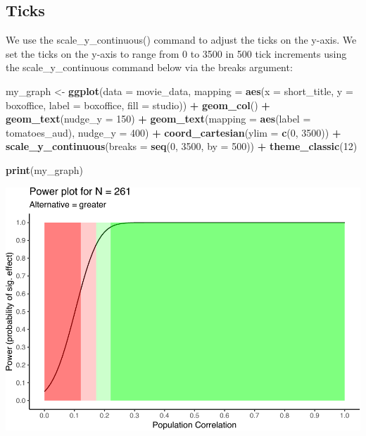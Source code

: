 \documentclass[
]{krantz}
\makeatletter
\newenvironment{Shaded}{\begin{snugshade}}{\end{snugshade}}
\newcommand{\DataTypeTok}[1]{\textcolor[rgb]{0.27,0.27,0.27}{#1}}
\newcommand{\DecValTok}[1]{\textcolor[rgb]{0.06,0.06,0.06}{#1}}
\newcommand{\KeywordTok}[1]{\textcolor[rgb]{0.27,0.27,0.27}{\textbf{#1}}}
\newcommand{\NormalTok}[1]{#1}
\newcommand{\OperatorTok}[1]{\textcolor[rgb]{0.43,0.43,0.43}{\textbf{#1}}}
\newcommand{\StringTok}[1]{\textcolor[rgb]{0.5,0.5,0.5}{#1}}
\newenvironment{kframe}{%
\medskip{}
\setlength{\fboxsep}{.8em}
 \def\at@end@of@kframe{}%
 \ifinner\ifhmode%
  \def\at@end@of@kframe{\end{minipage}}%
  \begin{minipage}{\columnwidth}%
 \fi\fi%
 \def\FrameCommand##1{\hskip\@totalleftmargin \hskip-\fboxsep
 \colorbox{shadecolor}{##1}\hskip-\fboxsep
     \hskip-\linewidth \hskip-\@totalleftmargin \hskip\columnwidth}%
 \MakeFramed {\advance\hsize-\width
   \@totalleftmargin\z@ \linewidth\hsize
   \@setminipage}}%
 {\par\unskip\endMakeFramed%
 \at@end@of@kframe}
\renewenvironment{Shaded}{\begin{kframe}}{\end{kframe}}
\makeatother
\begin{document}
\hypertarget{ticks}{%
\subsection{Ticks}\label{ticks}}

We use the scale\_y\_continuous() command to adjust the ticks on the y-axis. We set the ticks on the y-axis to range from 0 to 3500 in 500 tick increments using the scale\_y\_continuous command below via the breaks argument:

\begin{Shaded}
\begin{Highlighting}[]
\NormalTok{my_graph <-}\StringTok{ }\KeywordTok{ggplot}\NormalTok{(}\DataTypeTok{data =}\NormalTok{ movie_data,}
           \DataTypeTok{mapping =} \KeywordTok{aes}\NormalTok{(}\DataTypeTok{x =}\NormalTok{ short_title,}
                         \DataTypeTok{y =}\NormalTok{ boxoffice,}
                         \DataTypeTok{label =}\NormalTok{ boxoffice, }
                         \DataTypeTok{fill =}\NormalTok{ studio)) }\OperatorTok{+}
\StringTok{  }\KeywordTok{geom_col}\NormalTok{() }\OperatorTok{+}
\StringTok{  }\KeywordTok{geom_text}\NormalTok{(}\DataTypeTok{nudge_y =} \DecValTok{150}\NormalTok{)  }\OperatorTok{+}
\StringTok{  }\KeywordTok{geom_text}\NormalTok{(}\DataTypeTok{mapping =} \KeywordTok{aes}\NormalTok{(}\DataTypeTok{label =}\NormalTok{ tomatoes_aud), }
            \DataTypeTok{nudge_y =} \DecValTok{400}\NormalTok{) }\OperatorTok{+}
\StringTok{  }\KeywordTok{coord_cartesian}\NormalTok{(}\DataTypeTok{ylim =} \KeywordTok{c}\NormalTok{(}\DecValTok{0}\NormalTok{, }\DecValTok{3500}\NormalTok{)) }\OperatorTok{+}
\StringTok{  }\KeywordTok{scale_y_continuous}\NormalTok{(}\DataTypeTok{breaks =} \KeywordTok{seq}\NormalTok{(}\DecValTok{0}\NormalTok{, }\DecValTok{3500}\NormalTok{, }\DataTypeTok{by =} \DecValTok{500}\NormalTok{)) }\OperatorTok{+}
\StringTok{  }\KeywordTok{theme_classic}\NormalTok{(}\DecValTok{12}\NormalTok{)}

\KeywordTok{print}\NormalTok{(my_graph)}
\end{Highlighting}
\end{Shaded}

\includegraphics[width=0.65\linewidth]{bookdown_files/figure-latex/unnamed-chunk-262-1}
\end{document}
